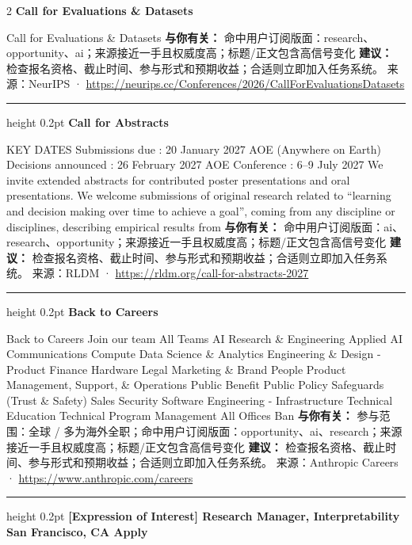 \documentclass[10.5pt]{ctexart}
\begin{document}
\begin{multicols}{2}
{\large\bfseries Call for Evaluations \& Datasets}\par
Call for Evaluations \& Datasets
\textbf{与你有关：} 命中用户订阅版面：research、opportunity、ai；来源接近一手且权威度高；标题/正文包含高信号变化
\textbf{建议：} 检查报名资格、截止时间、参与形式和预期收益；合适则立即加入任务系统。
{\footnotesize\color{ormuted} 来源：NeurIPS · \url{https://neurips.cc/Conferences/2026/CallForEvaluationsDatasets}}
\vspace{2mm}
\hrule height 0.2pt
\vspace{2mm}
{\large\bfseries Call for Abstracts}\par
KEY DATES Submissions due : 20 January 2027 AOE (Anywhere on Earth) Decisions announced : 26 February 2027 AOE Conference : 6–9 July 2027 We invite extended abstracts for contributed poster presentations and oral presentations. We welcome submissions of original research related to “learning and decision making over time to achieve a goal”, coming from any discipline or disciplines, describing empirical results from 
\textbf{与你有关：} 命中用户订阅版面：ai、research、opportunity；来源接近一手且权威度高；标题/正文包含高信号变化
\textbf{建议：} 检查报名资格、截止时间、参与形式和预期收益；合适则立即加入任务系统。
{\footnotesize\color{ormuted} 来源：RLDM · \url{https://rldm.org/call-for-abstracts-2027}}
\vspace{2mm}
\hrule height 0.2pt
\vspace{2mm}
{\large\bfseries Back to Careers}\par
Back to Careers Join our team All Teams AI Research \& Engineering Applied AI Communications Compute Data Science \& Analytics Engineering \& Design - Product Finance Hardware Legal Marketing \& Brand People Product Management, Support, \& Operations Public Benefit Public Policy Safeguards (Trust \& Safety) Sales Security Software Engineering - Infrastructure Technical Education Technical Program Management All Offices Ban
\textbf{与你有关：} 参与范围：全球 / 多为海外全职；命中用户订阅版面：opportunity、ai、research；来源接近一手且权威度高；标题/正文包含高信号变化
\textbf{建议：} 检查报名资格、截止时间、参与形式和预期收益；合适则立即加入任务系统。
{\footnotesize\color{ormuted} 来源：Anthropic Careers · \url{https://www.anthropic.com/careers}}
\vspace{2mm}
\hrule height 0.2pt
\vspace{2mm}
{\large\bfseries [Expression of Interest] Research Manager, Interpretability San Francisco, CA Apply}\par

\end{multicols}
\end{document}
